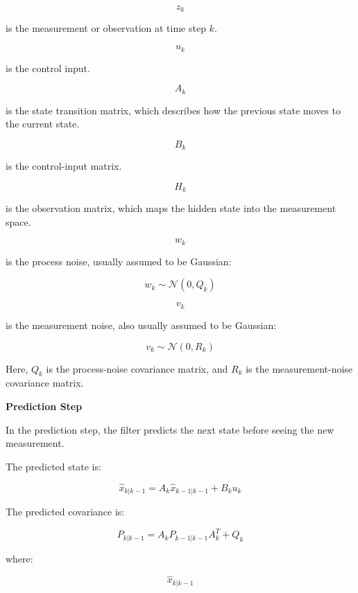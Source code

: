 \documentclass{book}
\providecommand{\ProjectDeepHeading}[2]{%
    \par\medskip\noindent\textbf{#2}\par\smallskip
}
\begin{document}
        \[
            z_k
        \]
        
        is the measurement or observation at time step \(k\).
        
        \[
            u_k
        \]
        
        is the control input.
        
        \[
            A_k
        \]
        
        is the state transition matrix, which describes how the previous state moves to the current state.
        
        \[
            B_k
        \]
        
        is the control-input matrix.
        
        \[
            H_k
        \]
        
        is the observation matrix, which maps the hidden state into the measurement space.
        
        \[
            w_k
        \]
        
        is the process noise, usually assumed to be Gaussian:
        
        \[
            w_k \sim \mathcal{N}(0, Q_k)
        \]
        
        \[
            v_k
        \]
        
        is the measurement noise, also usually assumed to be Gaussian:
        
        \[
            v_k \sim \mathcal{N}(0, R_k)
        \]
        
        Here, \(Q_k\) is the process-noise covariance matrix, and \(R_k\) is the measurement-noise covariance matrix.
    
    
    \ProjectDeepHeading{10}{Prediction Step}
        
        In the prediction step, the filter predicts the next state before seeing the new measurement.
        
        The predicted state is:
        
        \[
            \hat{x}_{k|k-1} = A_k \hat{x}_{k-1|k-1} + B_k u_k
        \]
        
        The predicted covariance is:
        
        \[
            P_{k|k-1} = A_k P_{k-1|k-1} A_k^T + Q_k
        \]
        
        where:
        
        \[
            \hat{x}_{k|k-1}
        \]
        
\end{document}
